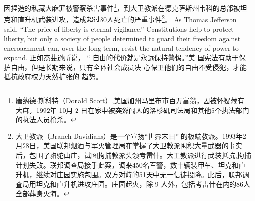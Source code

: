 \begin{paracol}{2}
因捏造的私藏大麻罪被警察杀害事件\footnote{唐纳德$\cdot$斯科特（Donald Scott）,美国加州马里布市百万富翁，因被怀疑藏有大麻，1992年 10月 2 日在家中被突然闯人的洛杉矶司法局和其他5个执法部门的执法人员枪杀。}，到大卫教派在德克萨斯州韦科的总部被坦克和直升机武装进攻，造成超过80人死亡的严重事件\footnote{大卫教派（Branch Davidians）是一个宣扬“世界末日” 的极端教派。1993年2月28日，美国联邦烟酒与军火管理局在掌握了大卫教派囤积大量武器的事实后，包围了骆驼山庄，试图拘捕教派头领考雷什。大卫教派进行武装抵抗,拘捕计划失败。联邦调查局接手此案，调来450名军警，数十辆装甲车、坦克和直升机，继续对庄园实施包围。双方对峙的51天中无一信徒投降。此后，联邦调査局用坦克和直升机进攻庄园。庄园起火，除 9 人外，包括考雷什在内的86人全部葬身火海。}。
\switchcolumn*
As Thomas Jefferson said, ``The price of liberty is eternal vigilance.'' Constitutions help to protect liberty, but only a society
of people determined to guard their freedom against encroachment can, over the long term, resist the natural tendency of
power to expand.
\switchcolumn
正如杰斐逊所说， “ 自由的代价就是永远保持警惕。”美
国宪法有助于保护自由，但是长期来说，只有全体社会成员决
心保卫他们的自由不受侵犯，才能抵抗政府权力天然扩张的
趋势。


\end{paracol}
